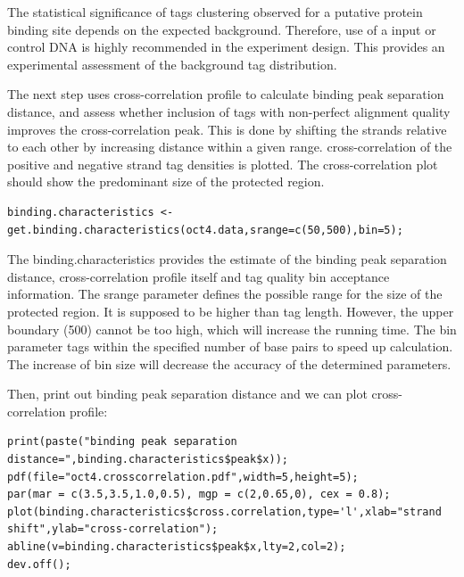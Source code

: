 \begin{note}
 The statistical significance of tags clustering observed for a putative protein binding site depends on the expected background. 
 Therefore, use of a input or control DNA is highly recommended in the experiment design. 
 This provides an experimental assessment of the background tag distribution. 
\end{note}

\begin{steps}
The next step uses cross-correlation profile to calculate binding peak separation distance, and assess whether inclusion of tags with non-perfect alignment quality improves the cross-correlation peak. 
This is done by shifting the strands relative to each other by increasing distance within a given range. cross-correlation of the positive and negative strand tag densities is plotted. 
The cross-correlation plot should show the predominant size of the protected region.

\begin{lstlisting}
binding.characteristics <- get.binding.characteristics(oct4.data,srange=c(50,500),bin=5);
\end{lstlisting}

The binding.characteristics provides the estimate of the binding peak separation distance, cross-correlation profile itself and tag quality bin acceptance information. 
The srange parameter defines the possible range for the size of the protected region. 
It is supposed to be higher than tag length. 
However, the upper boundary (500) cannot be too high, which will increase the running time. 
The bin parameter tags within the specified number of base pairs to speed up calculation. 
The increase of bin size will decrease the accuracy of the determined parameters. 
\end{steps}

\begin{steps}
Then, print out binding peak separation distance and we can plot cross-correlation profile:

\begin{lstlisting}
print(paste("binding peak separation distance=",binding.characteristics$peak$x));
pdf(file="oct4.crosscorrelation.pdf",width=5,height=5);
par(mar = c(3.5,3.5,1.0,0.5), mgp = c(2,0.65,0), cex = 0.8);
plot(binding.characteristics$cross.correlation,type='l',xlab="strand shift",ylab="cross-correlation");
abline(v=binding.characteristics$peak$x,lty=2,col=2);
dev.off();
\end{lstlisting}
\end{steps}

